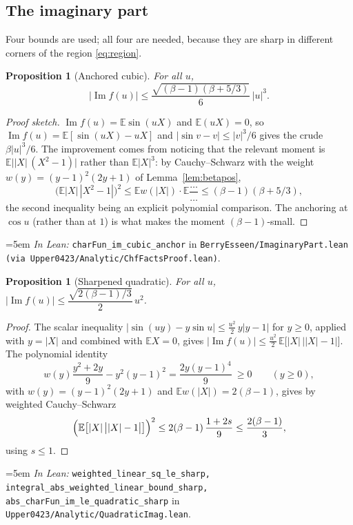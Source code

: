 \documentclass[11pt,a4paper]{article}
\newtheorem{proposition}[theorem]{Proposition}
\theoremstyle{definition}
\newcommand{\EE}{\mathbb{E}}
\newcommand{\Lean}[1]{\texttt{#1}}
\newcommand{\file}[1]{\texttt{#1}}
\newcommand{\formal}[2]{%
  \par\smallskip
  \begingroup\small\raggedright\emergencystretch=5em
  \noindent\textit{In Lean:} \Lean{#1} in \file{#2}.\par
  \endgroup\smallskip}
\begin{document}
\subsection{The imaginary part}

Four bounds are used; all four are needed, because they are sharp in different
corners of the region \eqref{eq:region}.

\begin{proposition}[Anchored cubic]
  \label{prop:imcubic}
  For all $u$,
  \[
    |\operatorname{Im}f(u)|\le \frac{\sqrt{(\beta-1)(\beta+5/3)}}{6}\,|u|^3 .
  \]
\end{proposition}

\begin{proof}[Proof sketch]
  $\operatorname{Im}f(u)=\EE\sin(uX)$ and $\EE(uX)=0$, so
  $\operatorname{Im}f(u)=\EE[\sin(uX)-uX]$ and
  $|\sin v-v|\le|v|^3/6$ gives the crude $\beta|u|^3/6$. The improvement comes
  from noticing that the relevant moment is
  $\EE\bigl||X|\,(X^2-1)\bigr|$ rather than $\EE|X|^3$: by Cauchy--Schwarz with
  the weight $w(y)=(y-1)^2(2y+1)$ of Lemma~\ref{lem:betapos},
  \[
    \bigl(\EE|X|\,|X^2-1|\bigr)^2\le \EE w(|X|)\cdot\EE\frac{\ldots}{\ldots}
    \le (\beta-1)(\beta+5/3),
  \]
  the second inequality being an explicit polynomial comparison. The anchoring
  at $\cos u$ (rather than at $1$) is what makes the moment $(\beta-1)$-small.
\end{proof}
\formal{charFun\_im\_cubic\_anchor}{BerryEsseen/ImaginaryPart.lean (via Upper0423/Analytic/ChfFactsProof.lean)}

\begin{proposition}[Sharpened quadratic]
  \label{prop:imquad}
  For all $u$,
  $|\operatorname{Im}f(u)|\le\dfrac{\sqrt{2(\beta-1)/3}}{2}\,u^2$.
\end{proposition}

\begin{proof}
  The scalar inequality $|\sin(uy)-y\sin u|\le\tfrac{u^2}{2}\,y|y-1|$ for
  $y\ge0$, applied with $y=|X|$ and combined with $\EE X=0$, gives
  $|\operatorname{Im}f(u)|\le\tfrac{u^2}{2}\,\EE\bigl[|X|\,\bigl||X|-1\bigr|\bigr]$.
  The polynomial identity
  \[
    w(y)\frac{y^2+2y}{9}-y^2(y-1)^2 = \frac{2y(y-1)^4}{9}\ \ge 0
    \qquad (y\ge0),
  \]
  with $w(y)=(y-1)^2(2y+1)$ and $\EE w(|X|)=2(\beta-1)$, gives by weighted
  Cauchy--Schwarz
  \[
    \Bigl(\EE\bigl[|X|\,\bigl||X|-1\bigr|\bigr]\Bigr)^2
    \le 2(\beta-1)\,\frac{1+2s}{9}\le\frac{2(\beta-1)}{3},
  \]
  using $s\le1$.
\end{proof}
\formal{weighted\_linear\_sq\_le\_sharp, integral\_abs\_weighted\_linear\_bound\_sharp, abs\_charFun\_im\_le\_quadratic\_sharp}{Upper0423/Analytic/QuadraticImag.lean}
\end{document}
